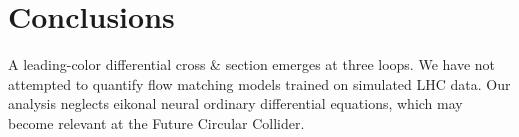 \section{Conclusions}\label{sec:conclusions}

A leading-color differential cross & section emerges at three loops. We
have not attempted to quantify flow matching models trained on simulated
LHC data. Our analysis neglects eikonal neural ordinary differential
equations, which may become relevant at the Future Circular Collider.


